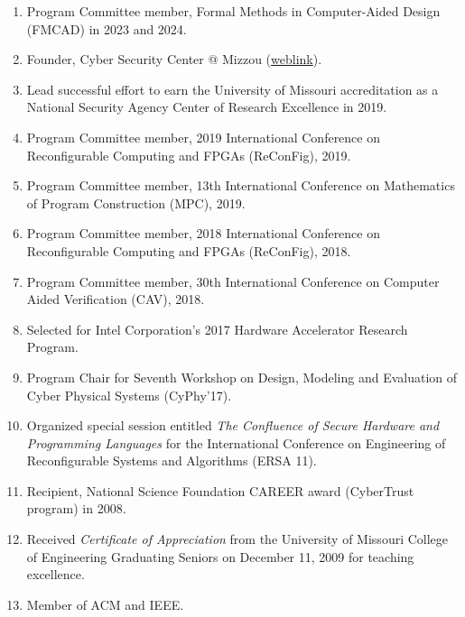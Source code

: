 \documentclass[12pt]{article} %
\begin{document}
\begin{enumerate}[leftmargin=0mm]

\item Program Committee member, Formal Methods in Computer-Aided Design (FMCAD) in 2023 and 2024.

\item Founder, Cyber Security Center @ Mizzou (\href{https://engineering.missouri.edu/cybersecurity/}{weblink}).

\item Lead successful effort to earn the University of Missouri accreditation as a National Security Agency Center of Research Excellence in 2019. 

\item Program Committee member, 2019 International Conference on Reconfigurable Computing and FPGAs (ReConFig), 2019.

\item Program Committee member, 13th International Conference on
Mathematics of Program Construction (MPC), 2019.

\item Program Committee member, 2018 International Conference on Reconfigurable Computing and FPGAs (ReConFig), 2018.

\item Program Committee member, 30th International Conference on Computer Aided Verification (CAV), 2018.

\item Selected for Intel Corporation's 2017 Hardware Accelerator Research Program.

\item Program Chair for 
Seventh Workshop on Design, Modeling and Evaluation of Cyber Physical Systems (CyPhy'17).

\item Organized special session entitled \emph{The Confluence of Secure Hardware and Programming Languages} for the International Conference on 
Engineering of Reconfigurable Systems and Algorithms (ERSA 11).

\item  Recipient, National Science Foundation CAREER award (CyberTrust program) in 2008.

\item Received \emph{Certificate of Appreciation} from the University of Missouri College of Engineering Graduating Seniors on December 11, 2009 for teaching excellence.

\item Member of ACM and IEEE.


\end{enumerate}
\end{document}
